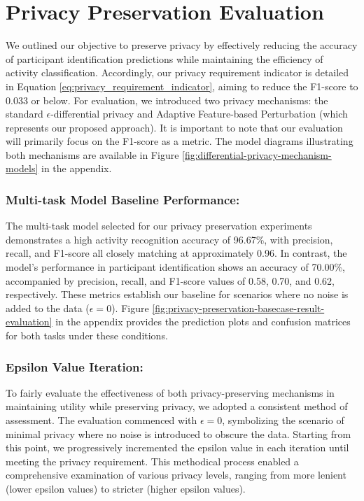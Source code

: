 \documentclass{l4proj}
\begin{document}
\section{Privacy Preservation Evaluation}
We outlined our objective to preserve privacy by effectively reducing the accuracy of participant identification predictions while maintaining the efficiency of activity classification. Accordingly, our privacy requirement indicator is detailed in Equation \ref{eq:privacy_requirement_indicator}, aiming to reduce the F1-score to 0.033 or below. For evaluation, we introduced two privacy mechanisms: the standard $\epsilon$-differential privacy and Adaptive Feature-based Perturbation (which represents our proposed approach). It is important to note that our evaluation will primarily focus on the F1-score as a metric. The model diagrams illustrating both mechanisms are available in Figure \ref{fig:differential-privacy-mechanism-models} in the appendix.

\subsubsection{Multi-task Model Baseline Performance:}
The multi-task model selected for our privacy preservation experiments demonstrates a high activity recognition accuracy of 96.67\%, with precision, recall, and F1-score all closely matching at approximately 0.96. In contrast, the model's performance in participant identification shows an accuracy of 70.00\%, accompanied by precision, recall, and F1-score values of 0.58, 0.70, and 0.62, respectively. These metrics establish our baseline for scenarios where no noise is added to the data ($\epsilon=0$). Figure \ref{fig:privacy-preservation-basecase-result-evaluation} in the appendix provides the prediction plots and confusion matrices for both tasks under these conditions.

\subsubsection{Epsilon Value Iteration:} 
To fairly evaluate the effectiveness of both privacy-preserving mechanisms in maintaining utility while preserving privacy, we adopted a consistent method of assessment. The evaluation commenced with $\epsilon=0$, symbolizing the scenario of minimal privacy where no noise is introduced to obscure the data. Starting from this point, we progressively incremented the epsilon value in each iteration until meeting the privacy requirement. This methodical process enabled a comprehensive examination of various privacy levels, ranging from more lenient (lower epsilon values) to stricter (higher epsilon values).
\end{document}
